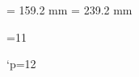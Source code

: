 
\immediate\message{\string\hsize=159.2 mm \string\vsize=239.2 mm}

\hsize= 159.2 mm
\vsize= 239.2 mm

{=11                          %

\gdef\m@g{\mag\count@
  \hsize=159.2truemm \vsize=239.2truemm \dimen\footins8truein
  \ifx\pdfpagewidth\undefined\else     %
     \recount@true\pdfpagewidth   %
     \recount@true\pdfpageheight  %
     \recount@true\pdfhorigin
     \recount@true\pdfvorigin
  \fi
}
\gdef\recount@true#1{#1=\expandafter\recount@trueA\the#1truept\relax}
{\catcode`p=12 \gdef\recount@trueA#1p#2{#1}}

}
